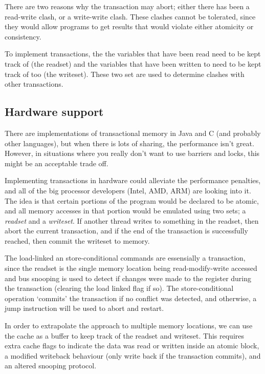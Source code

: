 There are two reasons why the transaction may abort; either there has
been a read-write clash, or a write-write clash. These clashes cannot
be tolerated, since they would allow programs to get results that
would violate either atomicity or consistency.

To implement transactions, the the variables that have been read need
to be kept track of (the readset) and the variables that have been
written to need to be kept track of too (the writeset). These two set
are used to determine clashes with other transactions.


\subsection{Hardware support}

There are implementations of transactional memory in Java and C (and
probably other languages), but when there is lots of sharing, the
performance isn't great. However, in situations where you really don't
want to use barriers and locks, this might be an acceptable trade off.

Implementing transactions in hardware could alleviate the performance
penalties, and all of the big processor developers (Intel, AMD, ARM)
are looking into it. The idea is that certain portions of the program
would be declared to be atomic, and all memory accesses in that
portion would be emulated using two sets; a \textit{readset} and
a \textit{writeset}. If another thread writes to something in the
readset, then abort the current transaction, and if the end of the
transaction is successfully reached, then commit the writeset to
memory.

The load-linked an store-conditional commands are essensially a
transaction, since the readset is the single memory location being
read-modify-write accessed and bus snooping is used to detect if
changes were made to the register during the transaction (clearing the
load linked flag if so). The store-conditional operation `commits' the
transaction if no conflict was detected, and otherwise, a jump
instruction will be used to abort and restart.

In order to extrapolate the approach to multiple memory locations, we
can use the cache as a buffer to keep track of the readset and
writeset. This requires extra cache flags to indicate the data was
read or written inside an atomic block, a modified writeback behaviour
(only write back if the transaction commits), and an altered snooping
protocol.

